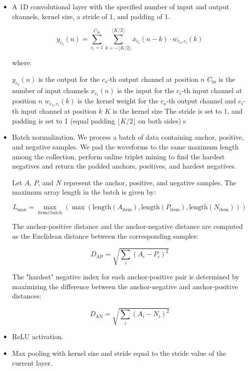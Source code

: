 \begin{itemize}
    \item A 1D convolutional layer with the specified number of input and output channels, kernel size, a stride of 1, and padding of 1.

    \begin{equation}
y_{c_o}(n) = \sum_{c_i=1}^{C_{\text{in}}} \sum_{k=-\lfloor K/2 \rfloor}^{\lfloor K/2 \rfloor} x_{c_i}(n - k) \cdot w_{c_o, c_i}(k)
\end{equation}

where:

$y_{c_o}(n)$ is the output for the $c_o$-th output channel at position $n$
$C_{\text{in}}$ is the number of input channels
$x_{c_i}(n)$ is the input for the $c_i$-th input channel at position $n$
$w_{c_o, c_i}(k)$ is the kernel weight for the $c_o$-th output channel and $c_i$-th input channel at position $k$
$K$ is the kernel size
The stride is set to 1, and padding is set to 1 (equal padding $\lfloor K/2 \rfloor$ on both sides)
s
    \item Batch normalization. We process a batch of data containing anchor, positive, and negative samples. We pad the waveforms to the same  maximum length among the collection, perform online triplet mining to find the hardest negatives and return the padded anchors, positives, and hardest negatives.

    Let $A$, $P$, and $N$ represent the anchor, positive, and negative samples. The maximum array length in the batch is given by:

    \begin{equation}
L_{\text{max}} = \max_{\text{item} \in \text{batch}}(\max(\text{length}(A_{\text{item}}), \text{length}(P_{\text{item}}), \text{length}(N_{\text{item}})))
\end{equation}

    The anchor-positive distance and the anchor-negative distance are computed as the Euclidean distance between the corresponding samples:

    \begin{equation}
D_{\text{AP}} = \sqrt{\sum_{i} (A_i - P_i)^2}
\end{equation}

    The "hardest" negative index for each anchor-positive pair is determined by maximizing the difference between the anchor-negative and anchor-positive distances:

    \begin{equation}
D_{\text{AN}} = \sqrt{\sum_{i} (A_i - N_i)^2}
\end{equation}

    
    \item ReLU activation. 

    
    \item Max pooling with kernel size and stride equal to the stride value of the current layer.
\end{itemize}

